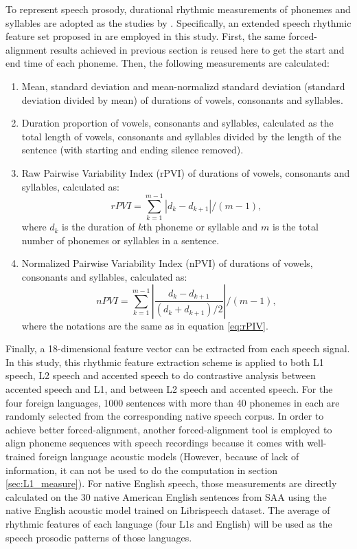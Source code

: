 To represent speech prosody, durational rhythmic measurements of phonemes and syllables are adopted as the studies by \cite{ramus1999correlates,grabe2002durational}. Specifically, an extended speech rhythmic feature set proposed in \citep{lai2013applying} are employed in this study. First, the same forced-alignment results achieved in previous section is reused here to get the start and end time of each phoneme. Then, the following measurements are calculated:
\begin{enumerate}
\item Mean, standard deviation and mean-normalizd standard deviation (standard deviation divided by mean) of durations of vowels, consonants and syllables.
\item Duration proportion of vowels, consonants and syllables, calculated as the total length of vowels, consonants and syllables divided by the length of the sentence (with starting and ending silence removed).
\item Raw Pairwise Variability Index (rPVI) of durations of vowels, consonants and syllables, calculated as:
    \begin{equation}
    \label{eq:rPIV}
    rPVI= \sum_{k=1}^{m-1} |d_k-d_{k+1}|/(m-1),
    \end{equation}
    where $d_k$ is the duration of $k$th phoneme or syllable and $m$ is the total number of phonemes or syllables in a sentence.
\item Normalized Pairwise Variability Index (nPVI) of durations of vowels, consonants and syllables, calculated as:
    \begin{equation}
    \label{eq:nPIV}
    nPVI= \sum_{k=1}^{m-1} |\frac{d_k-d_{k+1}}{(d_k + d_{k+1})/2}|/(m-1),
    \end{equation}
    where the notations are the same as in equation \ref{eq:rPIV}.
\end{enumerate}

Finally, a 18-dimensional feature vector can be extracted from each speech signal. In this study, this rhythmic feature extraction scheme is applied to both L1 speech, L2 speech and accented speech to do contrastive analysis between accented speech and L1, and between L2 speech and accented speech. For the four foreign languages, 1000 sentences with more than 40 phonemes in each are randomly selected from the corresponding native speech corpus. In order to achieve better forced-alignment, another forced-alignment tool \citep{mcauliffe2017montreal} is employed to align phoneme sequences with speech recordings because it comes with well-trained foreign language acoustic models (However, because of lack of information, it can not be used to do the computation in section \ref{sec:L1_measure}). For native English speech, those measurements are directly calculated on the 30 native American English sentences from SAA using the native English acoustic model trained on Librispeech dataset. The average of rhythmic features of each language (four L1s and English) will be used as the speech prosodic patterns of those languages.

